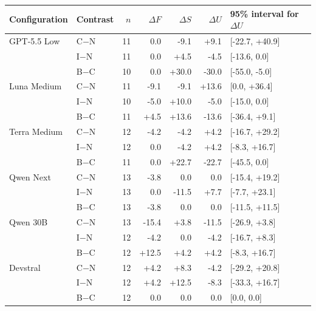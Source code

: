 \begin{tabular}{llrrrrl}
\toprule
Configuration & Contrast & $n$ & $\Delta F$ & $\Delta S$ & $\Delta U$ & 95\% interval for $\Delta U$\\
\midrule
GPT-5.5 Low & C$-$N & 11 & 0.0 & -9.1 & +9.1 & [-22.7, +40.9]\\
 & I$-$N & 11 & 0.0 & +4.5 & -4.5 & [-13.6, 0.0]\\
 & B$-$C & 10 & 0.0 & +30.0 & -30.0 & [-55.0, -5.0]\\
\addlinespace[2pt]
Luna Medium & C$-$N & 11 & -9.1 & -9.1 & +13.6 & [0.0, +36.4]\\
 & I$-$N & 10 & -5.0 & +10.0 & -5.0 & [-15.0, 0.0]\\
 & B$-$C & 11 & +4.5 & +13.6 & -13.6 & [-36.4, +9.1]\\
\addlinespace[2pt]
Terra Medium & C$-$N & 12 & -4.2 & -4.2 & +4.2 & [-16.7, +29.2]\\
 & I$-$N & 12 & 0.0 & -4.2 & +4.2 & [-8.3, +16.7]\\
 & B$-$C & 11 & 0.0 & +22.7 & -22.7 & [-45.5, 0.0]\\
\addlinespace[2pt]
Qwen Next & C$-$N & 13 & -3.8 & 0.0 & 0.0 & [-15.4, +19.2]\\
 & I$-$N & 13 & 0.0 & -11.5 & +7.7 & [-7.7, +23.1]\\
 & B$-$C & 13 & -3.8 & 0.0 & 0.0 & [-11.5, +11.5]\\
\addlinespace[2pt]
Qwen 30B & C$-$N & 13 & -15.4 & +3.8 & -11.5 & [-26.9, +3.8]\\
 & I$-$N & 12 & -4.2 & 0.0 & -4.2 & [-16.7, +8.3]\\
 & B$-$C & 12 & +12.5 & +4.2 & +4.2 & [-8.3, +16.7]\\
\addlinespace[2pt]
Devstral & C$-$N & 12 & +4.2 & +8.3 & -4.2 & [-29.2, +20.8]\\
 & I$-$N & 12 & +4.2 & +12.5 & -8.3 & [-33.3, +16.7]\\
 & B$-$C & 12 & 0.0 & 0.0 & 0.0 & [0.0, 0.0]\\
\bottomrule
\end{tabular}
